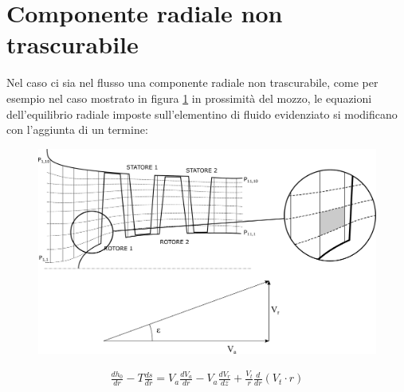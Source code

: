 \section{Componente radiale non trascurabile}
Nel caso ci sia nel flusso una componente radiale non trascurabile, come per esempio nel caso mostrato in figura \ref{fd:comp_rad} in prossimità del mozzo, le equazioni dell'equilibrio radiale imposte sull'elementino di fluido evidenziato si modificano con l'aggiunta di un termine:
\begin{figure}
	\centering
	\includegraphics[width=.8\textwidth]{fig/comp_rad.pdf}
	\caption{}
	\label{fd:comp_rad}
\end{figure}
\begin{align*}
\frac{d h_0}{dr} - T\frac{ds}{dr} = V_a \frac{dV_a}{dr} - \boxed{V_a \frac{dV_r}{dz}} + \frac{V_t}{r} \frac{d}{dr} ( V_t \cdot r)
\end{align*}
